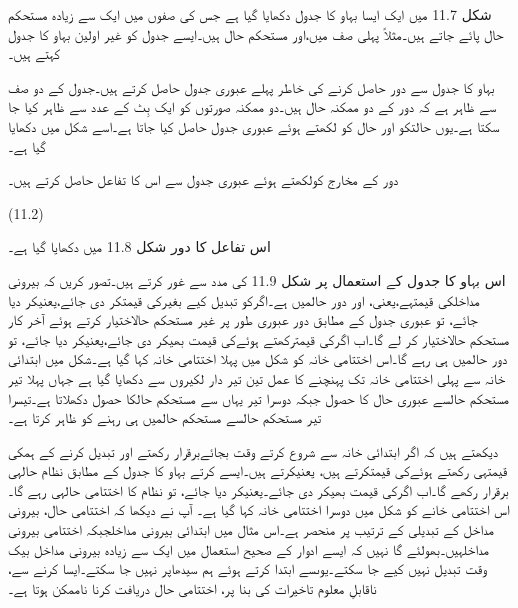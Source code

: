 
شکل 11.7 میں ایک ایسا بہاو کا جدول دکھایا گیا ہے جس کی صفوں میں ایک سے زیادہ مستحکم حال پائے جاتے ہیں۔مثلاً پہلی صف میں،اور مستحکم حال ہیں۔ایسے جدول کو غیر اولین بہاو کا جدول کہتے ہیں۔

 بہاو کا جدول سے دور حاصل کرنے کی خاطر پہلے عبوری جدول حاصل کرتے ہیں۔جدول کے دو صف سے ظاہر ہے کہ دور کے دو ممکنہ حال ہیں۔دو ممکنہ صورتوں کو ایک بِٹ کے عدد سے ظاہر کیا جا سکتا ہے۔یوں حالتکو اور حال کو لکھتے ہوئے عبوری جدول حاصل کیا جاتا ہے۔اسے شکل میں دکھایا گیا ہے۔

دور کے مخارج کولکھتے ہوئے عبوری جدول سے اس کا تفاعل حاصل کرتے ہیں۔

 
(11.2)

اس تفاعل کا دور شکل 11.8 میں دکھایا گیا ہے۔


	 اس بہاو کا جدول کے استعمال پر شکل 11.9 کی مدد سے غور کرتے ہیں۔تصور کریں کہ بیرونی مداخلکی قیمتہے،یعنی،  اور دور حالمیں ہے۔اگرکو تبدیل کیے بغیرکی قیمتکر دی جائے،یعنیکر دیا جائے، تو عبوری جدول کے مطابق دور  عبوری طور پر غیر مستحکم حالاختیار کرتے ہوئے آخر کار مستحکم حالاختیار کر لے  گا۔اب اگرکی قیمترکھتے ہوئےکی قیمت بھیکر دی جائے،یعنیکر دیا جائے، تو دور حالمیں ہی رہے گا۔اس اختتامی خانہ کو شکل میں پہلا اختتامی خانہ کہا گیا ہے۔شکل میں ابتدائی خانہ سے پہلی اختتامی خانہ تک پہنچنے کا عمل تین تیر دار لکیروں سے دکھایا گیا ہے جہاں پہلا تیر  مستحکم حالسے عبوری حال کا حصول جبکہ دوسرا تیر یہاں سے مستحکم حالکا حصول دکھلاتا ہے۔تیسرا تیر مستحکم حالسے مستحکم حالمیں ہی رہنے کو ظاہر کرتا ہے۔


	دیکھتے ہیں کہ اگر ابتدائی خانہ سے شروع کرتے وقت بجائےبرقرار رکھتے اور تبدیل کرنے کے ہمکی قیمتہی رکھتے ہوئےکی قیمتکرتے ہیں، یعنیکرتے ہیں۔ایسے کرتے بہاو کا جدول کے مطابق نظام حالہی برقرار رکھے گا۔اب اگرکی قیمت بھیکر دی جائے۔یعنیکر دیا جائے، تو نظام کا اختتامی حالہی رہے گا۔اس اختتامی خانے کو شکل میں دوسرا اختتامی خانہ کہا گیا ہے۔
	آپ نے دیکھا کہ اختتامی حال، بیرونی مداخل کے تبدیلی کے ترتیب پر منحصر ہے۔اس مثال میں ابتدائی بیرونی مداخلجبکہ اختتامی بیرونی مداخلہیں۔بھولئے گا نہیں کہ ایسے ادوار کے صحیح استعمال میں ایک سے زیادہ بیرونی مداخل بیک وقت تبدیل نہیں کیے جا سکتے۔یوںسے ابتدا کرتے ہوئے ہم سیدھاپر نہیں جا سکتے۔ایسا کرنے سے، ناقابلِ معلوم تاخیرات کی بنا پر، اختتامی حال دریافت کرنا ناممکن ہوتا ہے۔

